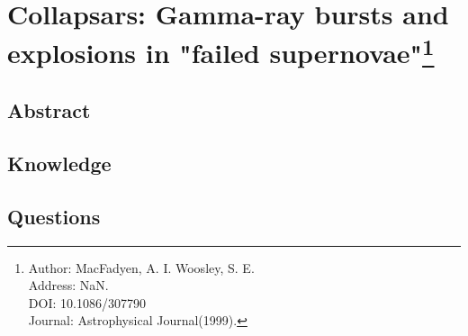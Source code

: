 \section[Collapsars: Gamma-ray bursts and explosions in "failed supernovae"]{Collapsars: Gamma-ray bursts and explosions in "failed supernovae"\protect\footnote{Author: MacFadyen, A. I. Woosley, S. E. \\Address: NaN. \\DOI: 10.1086/307790 \\Journal: Astrophysical Journal(1999).}}
\subsection{Abstract}

\subsection{Knowledge}

\subsection{Questions}